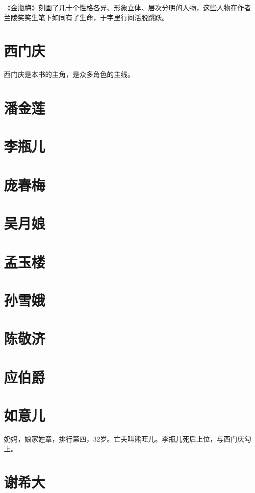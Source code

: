 《金瓶梅》刻画了几十个性格各异、形象立体、层次分明的人物，这些人物在作者兰陵笑笑生笔下如同有了生命，于字里行间活脱跳跃。

\section{西门庆}
西门庆是本书的主角，是众多角色的主线。

\section{潘金莲}

\section{李瓶儿}

\section{庞春梅}

\section{吴月娘}

\section{孟玉楼}

\section{孙雪娥}

\section{陈敬济}

\section{应伯爵}

\section{如意儿}
奶妈，娘家姓章，排行第四，32岁。亡夫叫熊旺儿。李瓶儿死后上位，与西门庆勾上。

\section{谢希大}

